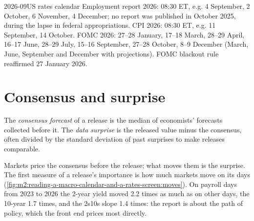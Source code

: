 \begin{dated}{2026-09}{US rates calendar}\label{dat:m2:reading-a-macro-calendar-and-a-rates-screen:calendar}
Employment report 2026: 08:30 ET, e.g. 4 September, 2 October, 6 November, 4 December; no
report was published in October 2025, during the lapse in federal appropriations. CPI 2026:
08:30 ET, e.g. 11 September, 14 October. FOMC 2026: 27--28 January, 17--18 March, 28--29
April, 16--17 June, 28--29 July, 15--16 September, 27--28 October, 8--9 December (March,
June, September and December with projections). FOMC blackout rule reaffirmed 27 January 2026.
\end{dated}

\section{Consensus and surprise}

\begin{definition}\label{def:m2:reading-a-macro-calendar-and-a-rates-screen:surprise}
The \emph{consensus forecast} of a release is the median of
economists' forecasts collected before it. The \emph{data surprise}
is the released value minus the consensus, often divided by the standard deviation of
past surprises to make releases comparable.
\end{definition}

Markets price the consensus before the release; what moves them is the surprise. The
first measure of a release's importance is how much markets move on its days
(\cref{fig:m2:reading-a-macro-calendar-and-a-rates-screen:moves}). On payroll days from
2023 to 2026 the 2-year yield moved 2.2 times as much as on other days, the 10-year 1.7
times, and the 2s10s slope 1.4 times: the report is about the path of policy, which the
front end prices most directly.

